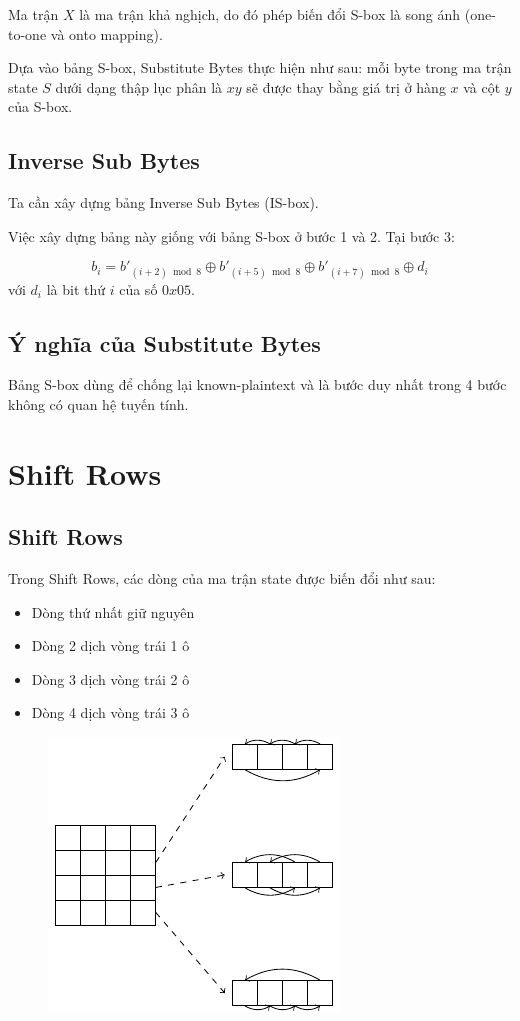 Ma trận $X$ là ma trận khả nghịch, do đó phép biến đổi S-box là song ánh (one-to-one và onto mapping).

Dựa vào bảng S-box, Substitute Bytes thực hiện như sau: mỗi byte trong ma trận state $S$ dưới dạng thập lục phân là $xy$ sẽ được thay bằng giá trị ở hàng $x$ và cột $y$ của S-box.

\subsection{Inverse Sub Bytes}

Ta cần xây dựng bảng Inverse Sub Bytes (IS-box).

Việc xây dựng bảng này giống với bảng S-box ở bước 1 và 2. Tại bước 3:

\[ b_i = b'_{(i+2) \bmod 8} \oplus b'_{(i+5) \bmod 8} \oplus b'_{(i+7) \bmod 8} \oplus d_i \]
với $d_i$ là bit thứ $i$ của số $0x05$.

\subsection{Ý nghĩa của Substitute Bytes}

Bảng S-box dùng để chống lại known-plaintext và là bước duy nhất trong 4 bước không có quan hệ tuyến tính.

\section{Shift Rows}

\subsection{Shift Rows}

Trong Shift Rows, các dòng của ma trận state được biến đổi như sau:

\begin{itemize}
    \item Dòng thứ nhất giữ nguyên
    \item Dòng 2 dịch vòng trái 1 ô
    \item Dòng 3 dịch vòng trái 2 ô
    \item Dòng 4 dịch vòng trái 3 ô
\end{itemize}

\begin{figure}[ht]
    \centering
    \includegraphics{../pics/aes/shiftrows.pdf}
\end{figure}

